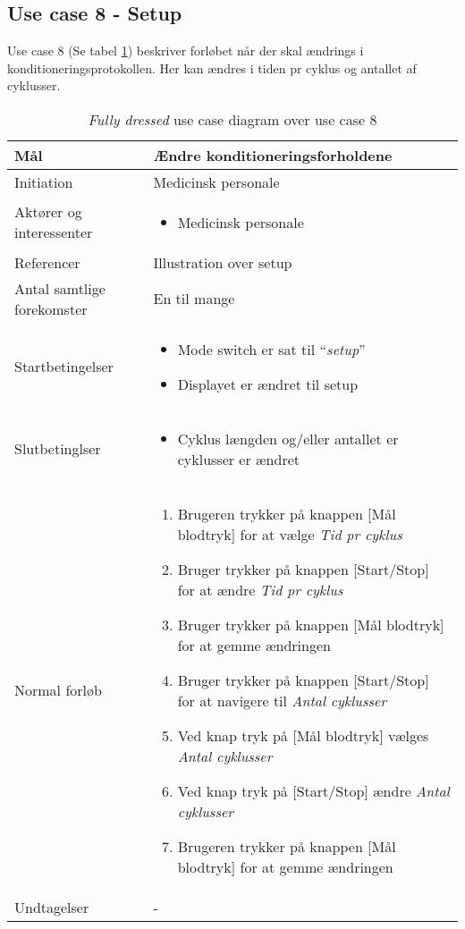 	\subsection{Use case 8 - Setup}
	Use case 8 (Se tabel \ref{tab:uc8}) beskriver forløbet når der skal ændrings i konditioneringsprotokollen. Her kan ændres i tiden pr cyklus og antallet af cyklusser. 
		\begin{table}[H]
				\begin{center}
			\begin{tabular}{ | p{} | p{}| } 
				\hline
				Mål & Ændre konditioneringsforholdene \\ 
				\hline
				Initiation &  Medicinsk personale\\
				\hline
				Aktører og interessenter & 
				\begin{itemize}
					\item Medicinsk personale 
				\end{itemize} \\ 
				\hline
				Referencer & Illustration over setup \\ 
				\hline
				Antal samtlige forekomster & En til mange \\ 
				\hline	
				Startbetingelser & 
				\begin{itemize}
					\item Mode switch er sat til “\textit{setup}” 
					\item Displayet er ændret til setup
 				\end{itemize} \\ 
				\hline
				Slutbetinglser & 
				\begin{itemize}
					\item Cyklus længden og/eller antallet er cyklusser er ændret
				\end{itemize} \\ 
				\hline
				Normal forløb & \begin{enumerate}
					\setlength\itemsep{0cm} %
					\item Brugeren trykker på knappen [Mål blodtryk]  for at vælge \textit{Tid pr cyklus}
					\item Bruger trykker på knappen [Start/Stop] for at ændre \textit{Tid pr cyklus}
					\item Bruger trykker på knappen [Mål blodtryk]  for at gemme ændringen
					\item Bruger trykker på knappen [Start/Stop] for at navigere til \textit{Antal cyklusser}
					\item Ved knap tryk på [Mål blodtryk]  vælges \textit{Antal cyklusser}
					\item Ved knap tryk på [Start/Stop] ændre \textit{Antal cyklusser}
					\item Brugeren trykker på knappen [Mål blodtryk] for at gemme ændringen
				\end{enumerate} \\ 
				\hline
				Undtagelser & -  \\ 
				\hline
			\end{tabular}
		\end{center}

			\caption{\textit{Fully dressed} use case diagram over use case 8} \label{tab:uc8}
		\end{table}
			\newpage
